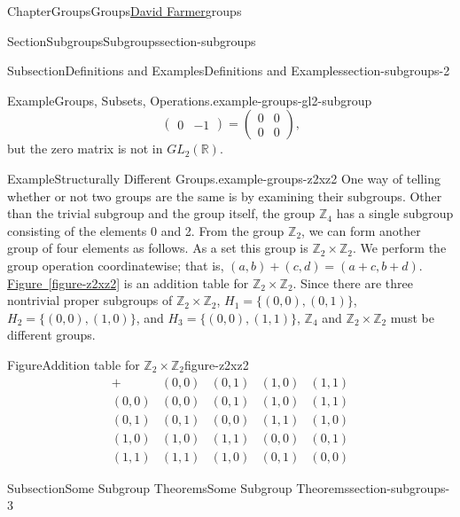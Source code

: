 \documentclass[oneside,10pt,]{book}
\newcommand{\xreffont}{\relax}
\numberwithin{equation}{section}
\begin{document}
\begin{chapterptx}{Chapter}{Groups}{}{Groups}{\hyperlink{dfarmer}{David Farmer}}{}{groups}
\begin{sectionptx}{Section}{Subgroups}{}{Subgroups}{}{}{section-subgroups}
\begin{subsectionptx}{Subsection}{Definitions and Examples}{}{Definitions and Examples}{}{}{section-subgroups-2}
\begin{example}{Example}{Groups, Subsets, Operations.}{example-groups-gl2-subgroup}
\begin{equation*}
\begin{pmatrix}
0  & -1
\end{pmatrix}
=
\begin{pmatrix}
0 & 0 \\
0 & 0
\end{pmatrix}\text{,}
\end{equation*}
but the zero matrix is not in \(GL_2( {\mathbb R })\).%
\end{example}
\begin{example}{Example}{Structurally Different Groups.}{example-groups-z2xz2}%
One way of telling whether or not two groups are the same is by examining their subgroups.  Other than the trivial subgroup and the group itself, the group \({\mathbb Z}_4\) has a single subgroup consisting of the elements 0 and 2. From the group \({\mathbb Z}_2\), we can form another group of four elements as follows.  As a set this group is \({\mathbb Z}_2 \times {\mathbb Z}_2\). We perform the group operation coordinatewise; that is, \((a,b) + (c,d) = (a+c, b+d)\). \hyperref[figure-z2xz2]{Figure~{\xreffont\ref{figure-z2xz2}}} is an addition table for \({\mathbb Z}_2 \times {\mathbb Z}_2\). Since there are three nontrivial proper subgroups of \({\mathbb Z}_2 \times {\mathbb Z}_2\), \(H_1 = \{ (0,0), (0,1) \}\), \(H_2 = \{ (0,0), (1,0) \}\), and \(H_3 = \{ (0,0), (1,1) \}\), \({\mathbb Z}_4\) and \({\mathbb Z}_2 \times {\mathbb Z}_2\) must be different groups.%
\begin{figureptx}{Figure}{Addition table for \({\mathbb Z}_2 \times {\mathbb Z}_2\)}{figure-z2xz2}{}%
\centering
%
\begin{equation*}
\begin{array}{c|cccc}
+     & (0,0) & (0,1) & (1,0) & (1,1) \\
\hline
(0,0) & (0,0) & (0,1) & (1,0) & (1,1) \\
(0,1) & (0,1) & (0,0) & (1,1) & (1,0) \\
(1,0) & (1,0) & (1,1) & (0,0) & (0,1) \\
(1,1) & (1,1) & (1,0) & (0,1) & (0,0)
\end{array}
\end{equation*}
%
\tcblower
\end{figureptx}%
\end{example}
\end{subsectionptx}
%
%
\typeout{************************************************}
\typeout{************************************************}
%
\begin{subsectionptx}{Subsection}{Some Subgroup Theorems}{}{Some Subgroup Theorems}{}{}{section-subgroups-3}

\end{subsectionptx}
\end{sectionptx}
\end{chapterptx}
\end{document}
